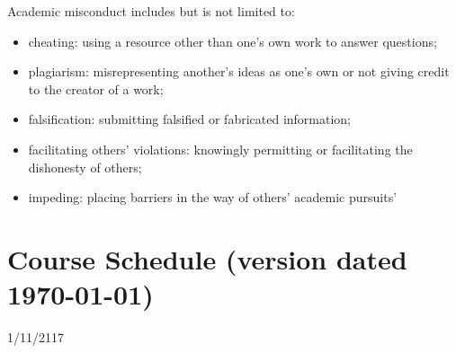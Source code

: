 \documentclass{tufte-handout}
\begin{document}
\begin{fullwidth}
Academic misconduct includes but is not limited to:

\begin{itemize}
	\item cheating: using a resource other than one's own work to answer questions;
	\item plagiarism: misrepresenting another's ideas as one's own or not giving credit to the creator of a work;
	\item falsification: submitting falsified or fabricated information;
	\item facilitating others' violations: knowingly permitting or facilitating the dishonesty of others;
	\item impeding: placing barriers in the way of others' academic pursuits'
\end{itemize}



\newpage 

\section{Course Schedule (version dated \today)}



  \setlength{\calwidth}{6.5in}
  \setlength{\calboxdepth}{0.7in}
  \begin{calendar}{1/11/21}{17}

  \calday[Monday]{\classday} %
  \calday[Tuesday]{\classday} %
  \skipday\skipday\skipday     
  \skipday\skipday %


















\end{calendar}
\end{fullwidth}
\end{document}
